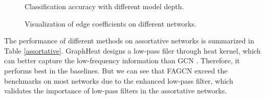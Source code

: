 \documentclass[letterpaper]{article} %
\begin{document}
\begin{figure}[t]
{    }
    \caption{Classification accuracy with different model depth.}
    \label{over-smoothing}
\end{figure}

\begin{figure}[t]
\centering
{}
\caption{Visualization of edge coefficients on different networks.}
\label{hist}
\end{figure}

The performance of different methods on assortative networks is summarized in Table \ref{assortative}. GraphHeat designs a low-pass filer through heat kernel, which can better capture the low-frequency information than GCN \cite{GraphHeat}. Therefore, it performs best in the baselines. But we can see that FAGCN exceed the benchmarks on most networks due to the enhanced low-pass filter, which validates the importance of low-pass filters in the assortative networks. 
\end{document}
